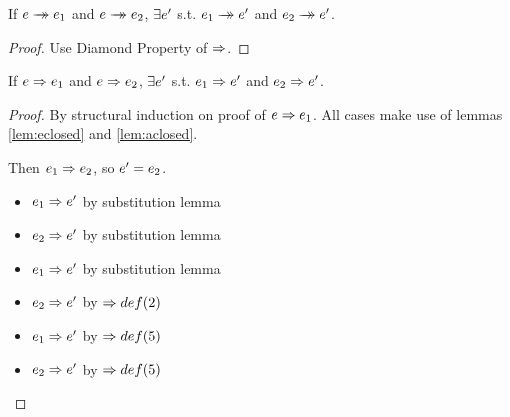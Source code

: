 \documentclass{article}
\begin{document}
\begin{theorem}
If $e \rightarrow\hspace{-8pt}\rightarrow e_1$ and $e \rightarrow\hspace{-8pt}\rightarrow e_2$, $\exists e'$ s.t. $e_1 \rightarrow\hspace{-8pt}\rightarrow e'$
and $e_2 \rightarrow\hspace{-8pt}\rightarrow e'$.
\end{theorem}

\begin{proof}
Use Diamond Property of $\Rightarrow$.
\end{proof}

\begin{lemma}
If $e \Rightarrow e_1$ and $e \Rightarrow e_2$, $\exists e'$ s.t. $e_1 \Rightarrow e'$
and $e_2 \Rightarrow e'$.
\end{lemma}

\begin{proof}
By structural induction on proof of $e \Rightarrow e_1$. All cases make use of
lemmas \ref{lem:eclosed} and \ref{lem:aclosed}.
\begin{byCases}
   Then $e_1 \Rightarrow e_2$, so $e' = e_2$.
  \renewcommand{\byCasesCaseTemplate}[1]{\textbf{Subcase {#1}.}}
  \begin{byCases}
    \begin{itemize}
      \item $e_1 \Rightarrow e'$ by substitution lemma
      \item $e_2 \Rightarrow e'$ by substitution lemma
    \end{itemize}
    \begin{itemize}
      \item $e_1 \Rightarrow e'$ by substitution lemma
      \item $e_2 \Rightarrow e'$ by $\Rightarrow def(2)$
    \end{itemize}
  \end{byCases}
  \renewcommand{\byCasesCaseTemplate}[1]{\textbf{Case {#1}.}}
  \renewcommand{\byCasesCaseTemplate}[1]{\textbf{Subcase {#1}.}}
  \begin{byCases}
    \begin{itemize}
      \item $e_1 \Rightarrow e'$ by $\Rightarrow def(5)$
      \item $e_2 \Rightarrow e'$ by $\Rightarrow def(5)$
    \end{itemize}

\end{byCases}
\end{byCases}
\end{proof}
\end{document}
